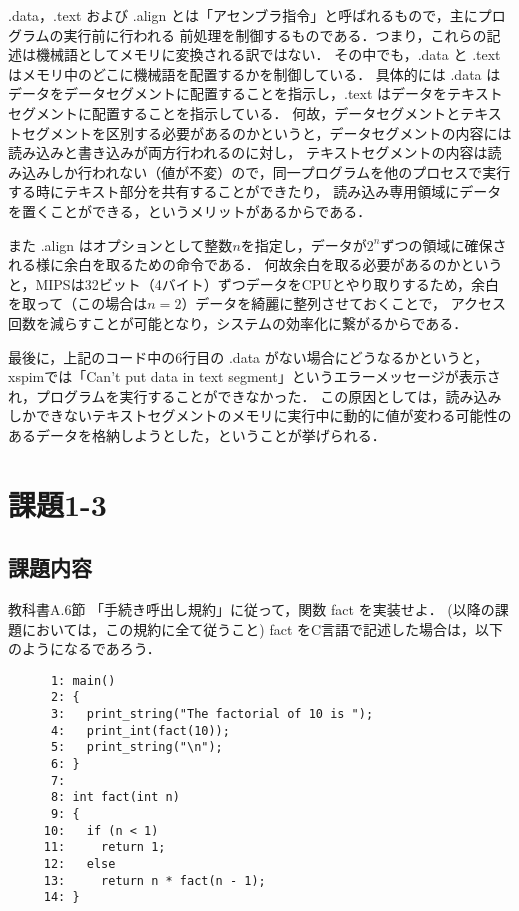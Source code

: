 \documentclass[a4j,11pt]{jarticle}
\begin{document}
.data，.text および .align とは「アセンブラ指令」と呼ばれるもので，主にプログラムの実行前に行われる
前処理を制御するものである．つまり，これらの記述は機械語としてメモリに変換される訳ではない．
その中でも，.data と .text はメモリ中のどこに機械語を配置するかを制御している．
具体的には .data はデータをデータセグメントに配置することを指示し，.text はデータをテキストセグメントに配置することを指示している．
何故，データセグメントとテキストセグメントを区別する必要があるのかというと，データセグメントの内容には読み込みと書き込みが両方行われるのに対し，
テキストセグメントの内容は読み込みしか行われない（値が不変）ので，同一プログラムを他のプロセスで実行する時にテキスト部分を共有することができたり，
読み込み専用領域にデータを置くことができる，というメリットがあるからである．

また .align はオプションとして整数$n$を指定し，データが$2^{n}$ずつの領域に確保される様に余白を取るための命令である．
何故余白を取る必要があるのかというと，MIPSは32ビット（4バイト）ずつデータをCPUとやり取りするため，余白を取って（この場合は$n = 2$）データを綺麗に整列させておくことで，
アクセス回数を減らすことが可能となり，システムの効率化に繋がるからである．

最後に，上記のコード中の6行目の .data がない場合にどうなるかというと，xspimでは「Can't put data in text segment」というエラーメッセージが表示され，プログラムを実行することができなかった．
この原因としては，読み込みしかできないテキストセグメントのメモリに実行中に動的に値が変わる可能性のあるデータを格納しようとした，ということが挙げられる．


\section{課題1-3}

\subsection{課題内容}
教科書A.6節 「手続き呼出し規約」に従って，関数 fact を実装せよ．
(以降の課題においては，この規約に全て従うこと) fact をC言語で記述した場合は，以下のようになるであろう．
\begin{verbatim}
      1: main()
      2: {
      3:   print_string("The factorial of 10 is ");
      4:   print_int(fact(10));
      5:   print_string("\n");
      6: }
      7: 
      8: int fact(int n)
      9: {
     10:   if (n < 1)
     11:     return 1;
     12:   else
     13:     return n * fact(n - 1);
     14: }
\end{verbatim}
\end{document}
